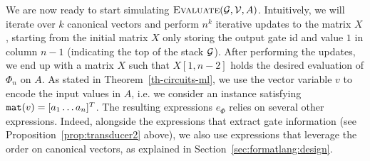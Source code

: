 	
We are now ready to start simulating $\textsc{Evaluate}(\mathcal{G},\mathcal{V},A)$. Intuitively, we will iterate over $k$ canonical vectors and perform
$n^k$ iterative updates to the matrix $X$, starting from the initial matrix $X$ only storing the output gate id and value $1$ in column $n-1$
(indicating the top of the stack $\mathcal{G}$). After performing the updates, we end up with a matrix $X$ such that $X[1,n-2]$ holds the desired
evaluation of $\Phi_n$ on $A$. As stated in Theorem~\ref{th-circuits-ml}, we use the vector variable $v$ to encode the input values in $A$, i.e. we consider
an instance satisfying $\texttt{mat}(v) = [a_1 \ldots a_n]^T$. The resulting \langfor expressions $e_\Phi$ relies on several other expressions. Indeed, alongside
the expressions that extract gate information (see Proposition~\ref{prop:transducer2} above), we also use \langfor expressions that leverage the order on canonical vectors, as explained in Section~\ref{sec:formatlang:design}. 

